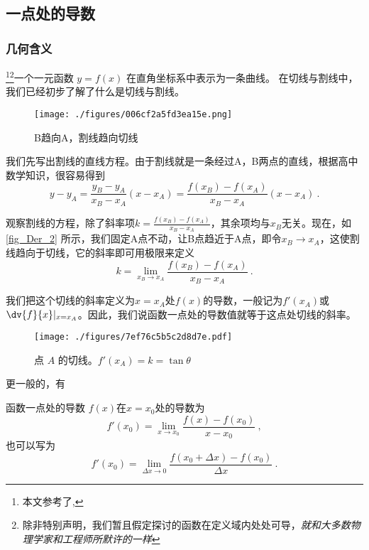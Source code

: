 

\subsection{一点处的导数}
\subsubsection{几何含义}
\footnote{本文参考了\cite{同济高},\cite{Thomas}}\footnote{除非特别声明，我们暂且假定探讨的函数在定义域内处处可导，\textsl{就和大多数物理学家和工程师所默许的一样}}一个一元函数 $y = f(x)$ 在直角坐标系中表示为一条曲线。 在切线与割线中，我们已经初步了解了什么是切线与割线。

\begin{figure}[ht]
\centering
\texttt{[image: ./figures/006cf2a5fd3ea15e.png]}
\caption{B趋向A，割线趋向切线} \label{fig_Der_2}
\end{figure}

我们先写出割线的直线方程。由于割线就是一条经过A，B两点的直线，根据高中数学知识，很容易得到
\begin{equation}
y-y_A=\frac{y_B-y_A}{x_B-x_A}(x-x_A)=\frac{f(x_B)-f(x_A)}{x_B-x_A}(x-x_A)~.
\end{equation}

观察割线的方程，除了斜率项$k=\frac{f(x_B)-f(x_A)}{x_B-x_A}$，其余项均与$x_B$无关。现在，如\autoref{fig_Der_2} 所示，我们固定A点不动，让B点趋近于A点，即令$x_B\rightarrow x_A$，这使割线趋向于切线，它的斜率即可用极限来定义
\begin{equation}
k=\lim_{x_B\to x_A}\frac{f(x_B)-f(x_A)}{x_B-x_A}~.
\end{equation}

我们把这个切线的斜率定义为$x=x_A$处$f(x)$的导数，一般记为$f'(x_A)$或$\dv{f}{x}|_{x=x_A}$。因此，我们说函数一点处的导数值就等于这点处切线的斜率。

\begin{figure}[ht]
\centering
\texttt{[image: ./figures/7ef76c5b5c2d8d7e.pdf]}
\caption{点 $A$ 的切线。$f'(x_A)=k=\tan \theta$} \label{fig_Der_20}
\end{figure}

更一般的，有
\begin{definition}{函数一点处的导数}
$f(x)$在$x=x_0$处的导数为
\begin{equation}
f'(x_0)=\lim_{x\to x_0}\frac{f(x)-f(x_0)}{x-x_0}~,
\end{equation}
也可以写为
\begin{equation}\label{eq_Der_2}
f'(x_0)=\lim_{\Delta x \to 0}\frac{f(x_0+\Delta x)-f(x_0)}{\Delta x}~.
\end{equation}
\end{definition}

